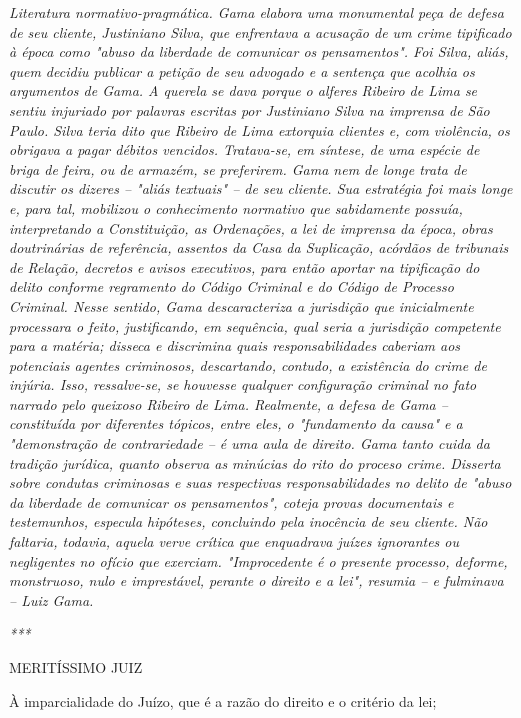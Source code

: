 \emph{Literatura normativo-pragmática. Gama elabora uma monumental peça
de defesa de seu cliente, Justiniano Silva, que enfrentava a acusação de
um crime tipificado à época como "abuso da liberdade de comunicar os
pensamentos". Foi Silva, aliás, quem decidiu publicar a petição de seu
advogado e a sentença que acolhia os argumentos de Gama. A querela se
dava porque o alferes Ribeiro de Lima se sentiu injuriado por palavras
escritas por Justiniano Silva na imprensa de São Paulo. Silva teria dito
que Ribeiro de Lima extorquia clientes e, com violência, os obrigava a
pagar débitos vencidos. Tratava-se, em síntese, de uma espécie de briga
de feira, ou de armazém, se preferirem. Gama nem de longe trata de
discutir os dizeres -- "aliás textuais" -- de seu cliente. Sua
estratégia foi mais longe e, para tal, mobilizou o conhecimento
normativo que sabidamente possuía, interpretando a Constituição, as
Ordenações, a lei de imprensa da época, obras doutrinárias de
referência, assentos da Casa da Suplicação, acórdãos de tribunais de
Relação, decretos e avisos executivos, para então aportar na tipificação
do delito conforme regramento do Código Criminal e do Código de Processo
Criminal. Nesse sentido, Gama descaracteriza a jurisdição que
inicialmente processara o feito, justificando, em sequência, qual seria
a jurisdição competente para a matéria; disseca e discrimina quais
responsabilidades caberiam aos potenciais agentes criminosos,
descartando, contudo, a existência do crime de injúria. Isso,
ressalve-se, se houvesse qualquer configuração criminal no fato narrado
pelo queixoso Ribeiro de Lima. Realmente, a defesa de Gama --
constituída por diferentes tópicos, entre eles, o "fundamento da causa"
e a "demonstração de contrariedade -- é uma aula de direito. Gama tanto
cuida da tradição jurídica, quanto observa as minúcias do rito do
proceso crime. Disserta sobre condutas criminosas e suas respectivas
responsabilidades no delito de "abuso da liberdade de comunicar os
pensamentos", coteja provas documentais e testemunhos, especula
hipóteses, concluindo pela inocência de seu cliente. Não faltaria,
todavia, aquela verve crítica que enquadrava juízes ignorantes ou
negligentes no ofício que exerciam. "Improcedente é o presente processo,
deforme, monstruoso, nulo e imprestável, perante o direito e a lei",
resumia -- e fulminava -- Luiz Gama. }

\emph{***}

MERITÍSSIMO JUIZ

À imparcialidade do Juízo, que é a razão do direito e o critério da lei;

